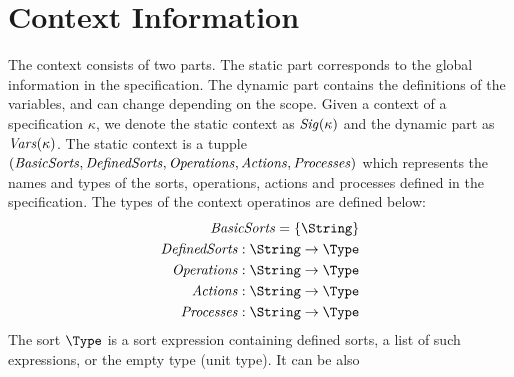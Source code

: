 \documentclass[fleqn,a4paper,dvips]{article}
\begin{document}
\section{Context Information}
The context consists of two parts. The static part corresponds to the
global information in the specification. The dynamic part contains the
definitions of the variables, and can change depending on the scope.
Given a context of a specification $\kappa$, we denote the static context as 
$\mathit{Sig(\kappa)}$ and the dynamic part as $\mathit{Vars}(\kappa)$. 
The static context is a tupple 
$(\mathit{BasicSorts},\mathit{DefinedSorts},\mathit{Operations},\mathit{Actions},\mathit{Processes})$
which represents the names and types of the sorts, operations, actions and processes 
defined in the specification.
The types of the context operatinos are defined below:
\begin{align*}
\nm{BasicSorts}=\set{\String}\\
\func{\nm{DefinedSorts}}{\String}{\Type}\\
\func{\nm{Operations}}{\String}{\Type}\\
\func{\nm{Actions}}{\String}{\Type}\\
\func{\nm{Processes}}{\String}{\Type}
\end{align*} 
The sort $\Type$ is a sort expression containing defined sorts, a list
of such expressions, or the empty type (unit type).  It can be also
\end{document}
